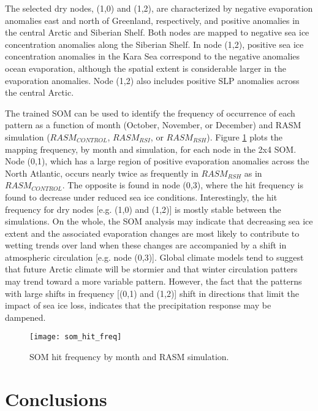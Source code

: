 The selected dry nodes, (1,0) and (1,2), are characterized by negative evaporation anomalies east and north of Greenland, respectively, and positive anomalies in the central Arctic and Siberian Shelf.
Both nodes are mapped to negative sea ice concentration anomalies along the Siberian Shelf.
In node (1,2), positive sea ice concentration anomalies in the Kara Sea correspond to the negative anomalies ocean evaporation, although the spatial extent is considerable larger in the evaporation anomalies.
Node (1,2) also includes positive SLP anomalies across the central Arctic. %

The trained SOM can be used to identify the frequency of occurrence of each pattern as a function of month (October, November, or December) and RASM simulation ($RASM_{CONTROL}$, $RASM_{RSI}$, or $RASM_{RSH}$).
Figure \ref{fig:som_hit_freq} plots the mapping frequency, by month and simulation, for each node in the 2x4 SOM.
Node (0,1), which has a large region of positive evaporation anomalies across the North Atlantic, occurs nearly twice as frequently in $RASM_{RSH}$ as in $RASM_{CONTROL}$.
The opposite is found in node (0,3), where the hit frequency is found to decrease under reduced sea ice conditions.
Interestingly, the hit frequency for dry nodes [e.g. (1,0) and (1,2)] is mostly stable between the simulations.
On the whole, the SOM analysis may indicate that decreasing sea ice extent and the associated evaporation changes are most likely to contribute to wetting trends over land when these changes are accompanied by a shift in atmospheric circulation [e.g. node (0,3)]. %
Global climate models tend to suggest that future Arctic climate will be stormier \citep{Vavrus_2012} and that winter circulation patters may trend toward a more variable pattern.
However, the fact that the patterns with large shifts in frequency [(0,1) and (1,2)] shift in directions that limit the impact of sea ice loss, indicates that the precipitation response may be dampened.

\begin{figure}
  \centering
  \texttt{[image: som\_hit\_freq]}
  \caption{SOM hit frequency by month and RASM simulation.}
  \label{fig:som_hit_freq}
\end{figure}



\section{Conclusions}
\label{sec:conclusions_ch5}

